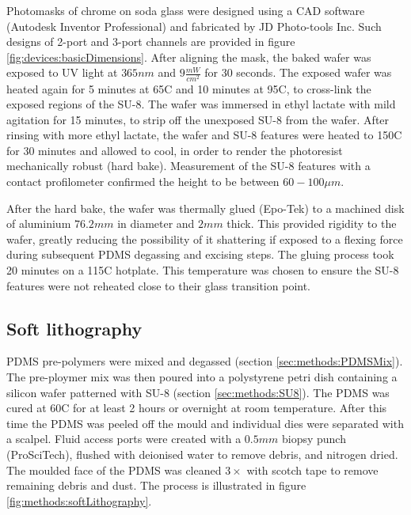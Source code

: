        Photomasks of chrome on soda glass were designed using a CAD software (Autodesk Inventor Professional) and fabricated by JD Photo-tools Inc. Such designs of 2-port and 3-port channels are provided in figure \ref{fig:devices:basicDimensions}. After aligning the mask, the baked wafer was exposed to UV light at \(365nm\) and \(9\frac{mW}{cm^{2}}\) for 30 seconds. The exposed wafer was heated again for 5 minutes at 65\degree C and 10 minutes at 95\degree C, to cross-link the exposed regions of the SU-8. The wafer was immersed in ethyl lactate with mild agitation for 15 minutes, to strip off the unexposed SU-8 from the wafer. After rinsing with more ethyl lactate, the wafer and SU-8 features were heated to 150\degree C for 30 minutes and allowed to cool, in order to render the photoresist mechanically robust (hard bake). Measurement of the SU-8 features with a contact profilometer confirmed the height to be between \(60-100\mu m\).

        After the hard bake, the wafer was thermally glued (Epo-Tek) to a machined disk of aluminium \(76.2mm\) in diameter and \(2mm\) thick. This provided rigidity to the wafer, greatly reducing the possibility of it shattering if exposed to a flexing force during subsequent PDMS degassing and excising steps.
        The gluing process took 20 minutes on a 115\degree C hotplate. This temperature was chosen to ensure the SU-8 features were not reheated close to their glass transition point.
        \label{sec:methods:SU8}

        \subsection{Soft lithography}
        PDMS pre-polymers were mixed and degassed (section \ref{sec:methods:PDMSMix}). The pre-ploymer mix was then poured into a polystyrene petri dish containing a silicon wafer patterned with SU-8 (section \ref{sec:methods:SU8}).
        The PDMS was cured at 60\degree C for at least 2 hours or overnight at room temperature. After this time the PDMS was peeled off the mould and individual dies were separated with a scalpel. Fluid access ports were created with a \(0.5mm\) biopsy punch (ProSciTech), flushed with deionised water to remove debris, and nitrogen dried. The moulded face of the PDMS was cleaned \(3\times\) with scotch tape to remove remaining debris and dust. The process is illustrated in figure \ref{fig:methods:softLithography}.

